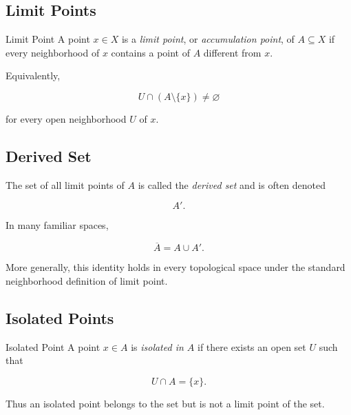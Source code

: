 \subsection{Limit Points}
\label{subsec:topological-limit-points}

\begin{definitionbox}{Limit Point}
A point \(x\in X\) is a \emph{limit point}, or \emph{accumulation point}, of
\(A\subseteq X\) if every neighborhood of \(x\) contains a point of
\(A\) different from \(x\).
\end{definitionbox}

Equivalently,

\[
\boxed{
U\cap(A\setminus\{x\})\neq\varnothing
}
\]

for every open neighborhood \(U\) of \(x\).

\subsection{Derived Set}
\label{subsec:derived-set}

The set of all limit points of \(A\) is called the \emph{derived set} and is
often denoted

\[
\boxed{
A'.
}
\]

In many familiar spaces,

\[
\boxed{
\overline{A}=A\cup A'.
}
\]

More generally, this identity holds in every topological space under the
standard neighborhood definition of limit point.

\subsection{Isolated Points}
\label{subsec:isolated-points}

\begin{definitionbox}{Isolated Point}
A point \(x\in A\) is \emph{isolated in \(A\)} if there exists an open set
\(U\) such that

\[
\boxed{
U\cap A=\{x\}.
}
\]
\end{definitionbox}

Thus an isolated point belongs to the set but is not a limit point of the
set.

